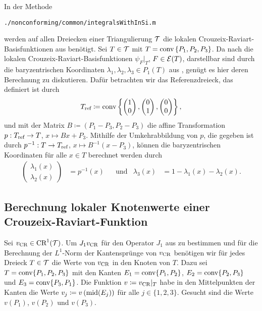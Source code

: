 In der Methode
\begin{center}
  \texttt{./nonconforming/common/integralsWithInSi.m}
\end{center}
werden auf allen Dreiecken einer Triangulierung $\mathcal{T}$ die lokalen
Crouzeix-Raviart-Basis\-funk\-tio\-nen aus 
benötigt. 
Sei $T\in\mathcal{T}$ mit $T=\textup{conv}\left\{P_1,P_2,P_3\right\}$.
Da nach  die lokalen
Crouzeix-Raviart-Basisfunktionen $\psi_{F}|_T$, $F\in\mathcal{E}(T)$, darstellbar
sind durch die baryzentrischen Koordinaten $\lambda_1,\lambda_2,\lambda_3\in
P_1(T)$ aus , genügt es hier deren
Berechnung zu diskutieren.
Dafür betrachten wir das Referenzdreieck, das definiert ist durch
\begin{align*}
  T_\textup{ref} \coloneqq
  \textup{conv}\left\{
  \begin{pmatrix}
   1\\0 
  \end{pmatrix},
  \begin{pmatrix}
   0\\1 
  \end{pmatrix},
  \begin{pmatrix}
   0\\0 
  \end{pmatrix}
  \right\},
\end{align*}
und mit der Matrix $B\coloneqq (P_1-P_3,P_2-P_3)$ die affine Transformation
$p:T_\textup{ref} \to T$, $x \mapsto Bx+P_3$. 
Mithilfe der Umkehrabbildung von $p$, die gegeben ist durch $p^{-1}:T\to T_\textup{ref}$,
$x\mapsto B^{-1}(x-P_3)$, können die baryzentrischen Koordinaten für alle $x\in
T$ berechnet werden durch 
\begin{align*}
  \begin{pmatrix}
    \lambda_1(x)\\
    \lambda_2(x)
  \end{pmatrix}
  &=
  p^{-1}(x) &&\text{und}
  &\lambda_3(x)
  &=1-\lambda_1(x)-\lambda_2(x).
\end{align*}


\subsection{Berechnung lokaler Knotenwerte einer Crouzeix-Raviart-Funktion}
\label{sec:localNodalValuesCR}

Sei $v_\textup{CR}\in\textup{CR}^1(\mathcal{T})$.
Um $J_1v_\textup{CR}$ für den Operator $J_1$ aus  zu
bestimmen und für die Berechnung der $L^1$-Norm der Kantensprünge von $v_\textup{CR}$
benötigen wir für jedes Dreieck $T\in\mathcal{T}$ die Werte von $v_\textup{CR}$ in den Knoten
von $T$. 
Dazu sei $T = \textup{conv}\{P_1, P_2, P_3\}$ mit den Kanten
$E_1 = \textup{conv}\{P_1,P_2\}$, $E_2 = \textup{conv}\{P_2,P_3\}$ und $E_3 =
\textup{conv}\{P_3,P_1\}$. 
Die Funktion $v\coloneqq v_\textup{CR}|_T$ habe in den Mittelpunkten der Kanten die Werte
$v_j\coloneqq v\left(\textup{mid}(E_j)\right)$ für alle $j\in\{1,2,3\}$. 
Gesucht sind die Werte $v(P_1)$, $v(P_2)$ und $v(P_3)$.

